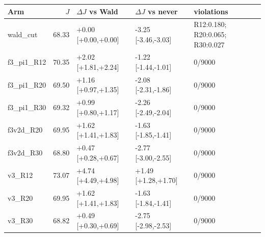 \begin{tabular}{@{}l r l l l@{}}
\toprule
Arm & $J$ & $\Delta J$ vs Wald & $\Delta J$ vs never & violations \\
\midrule
wald\_cut & 68.33 & +0.00 [+0.00,+0.00] & -3.25 [-3.46,-3.03] & R12:0.180; R20:0.065; R30:0.027 \\
f3\_pi1\_R12 & 70.35 & +2.02 [+1.81,+2.24] & -1.22 [-1.44,-1.01] & 0/9000 \\
f3\_pi1\_R20 & 69.50 & +1.16 [+0.97,+1.35] & -2.08 [-2.31,-1.86] & 0/9000 \\
f3\_pi1\_R30 & 69.32 & +0.99 [+0.80,+1.17] & -2.26 [-2.49,-2.04] & 0/9000 \\
f3v2d\_R20 & 69.95 & +1.62 [+1.41,+1.83] & -1.63 [-1.85,-1.41] & 0/9000 \\
f3v2d\_R30 & 68.80 & +0.47 [+0.28,+0.67] & -2.77 [-3.00,-2.55] & 0/9000 \\
v3\_R12 & 73.07 & +4.74 [+4.49,+4.98] & +1.49 [+1.28,+1.70] & 0/9000 \\
v3\_R20 & 69.95 & +1.62 [+1.41,+1.83] & -1.63 [-1.84,-1.41] & 0/9000 \\
v3\_R30 & 68.82 & +0.49 [+0.30,+0.69] & -2.75 [-2.98,-2.53] & 0/9000 \\
\bottomrule
\end{tabular}
